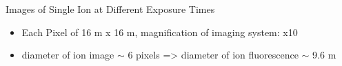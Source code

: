 \documentclass{beamer}
\begin{document}
\begin{frame}{Images of Single Ion at Different Exposure Times}

\begin{itemize}
\item Each Pixel of 16 \textmu m x 16 \textmu m, magnification of imaging system: x10
\bigskip
\item diameter of ion image $\sim$ 6 pixels => diameter of ion fluorescence $\sim$ 9.6 \textmu m

\end{itemize}


\begin{figure}
\centering
\renewcommand{\thesubfigure}{(a)}     
\renewcommand{\thesubfigure}{(b)}     
\renewcommand{\thesubfigure}{(c)}     
\end{figure}


\end{frame}
\end{document}
